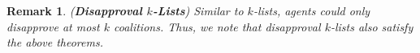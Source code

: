 \documentclass[letterpaper]{article} %
\newtheorem{remark}{Remark}
\begin{document}


\begin{remark}
{\normalfont (\textbf{Disapproval $k$-Lists})} Similar to $k$-lists, agents could only {\normalfont disapprove} at most $k$ coalitions. Thus, we note that {\normalfont disapproval} $k$-lists also satisfy the above theorems.
\end{remark}
\end{document}
